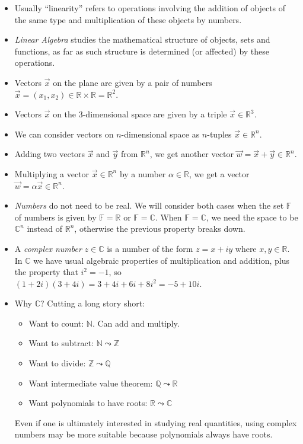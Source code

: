 \documentclass[11pt]{article}
\newcommand{\1}{\mathbf{1}}
\newcommand{\0}{\mathbf{0}}
\newcommand{\C}{\mathbb{C}}
\newcommand{\F}{\mathbb{F}}
\newcommand{\R}{\mathbb{R}}
\newcommand{\N}{\mathbb{N}}
\newcommand{\Q}{\mathbb{Q}}
\newcommand{\Z}{\mathbb{Z}}
\newcommand{\vx}{\vec{x}}
\newcommand{\vy}{\vec{y}}
\newcommand{\vw}{\vec{w}}
\begin{document}
\begin{itemize}

\item

Usually ``linearity'' refers to operations involving the addition of objects of the same type and multiplication of these objects by numbers.

\item

\emph{Linear Algebra} studies the mathematical structure of objects, sets and functions, as far as such structure is determined (or affected) by these operations.

\item

Vectors $\vx$ on the plane are given by a pair of numbers $\vx = (x_1,x_2) \in \R \times \R = \R^2$.

\item

Vectors $\vx$ on the 3-dimensional space are given by a triple $\vx \in \R^3$.

\item

We can consider vectors on $n$-dimensional space as $n$-tuples $\vx \in \R^n$.

\item

Adding two vectors $\vx$ and $\vy$ from $\R^n$, we get another vector $\vw = \vx + \vy \in \R^n$.

\item

Multiplying a vector $\vx \in \R^n$ by a number $\alpha \in \R$, we get a vector $\vw = \alpha \vx \in \R^n$.

\item

\emph{Numbers} do not need to be real.
We will consider both cases when the set $\F$ of numbers is given by $\F = \R$ or $\F = \C$.
When $\F=\C$, we need the space to be $\C^n$ instead of $\R^n$, otherwise the previous property breaks down.

\item

A \emph{complex number} $z \in \C$ is a number of the form $z = x+iy$ where $x,y\in \R$.
In $\C$ we have usual algebraic properties of multiplication and addition, plus the property that $i^2=-1$, so $(1+2i)(3+4i)=3+4i+6i+8i^2=-5+10i$.

\item

Why $\C$?
Cutting a long story short:
\begin{itemize}
\item Want to count: $\N$. Can add and multiply.
\item Want to subtract: $\N \leadsto \Z$
\item Want to divide: $\Z \leadsto \Q$
\item Want intermediate value theorem: $\Q \leadsto \R$
\item Want polynomials to have roots: $\R \leadsto \C$
\end{itemize}
Even if one is ultimately interested in studying real quantities, using complex numbers may be more suitable because polynomials always have roots.


\end{itemize}
\end{document}
